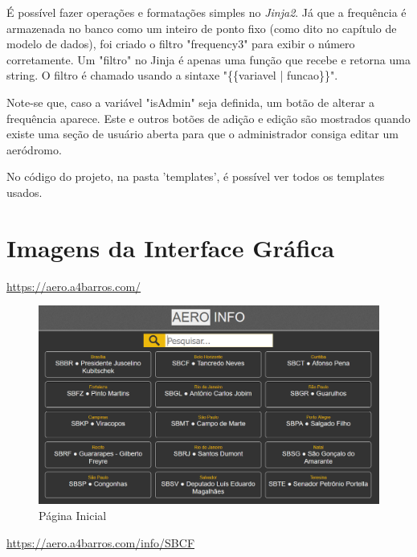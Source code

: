 É possível fazer operações e formatações simples no \textit{Jinja2}. Já que a frequência 
é armazenada no banco como um inteiro de ponto fixo (como dito no capítulo de modelo de dados), 
foi criado o filtro "frequency3" para exibir o número corretamente. Um "filtro" no Jinja 
é apenas uma função que recebe e retorna
uma string. O filtro é chamado usando a sintaxe "\{\{variavel | funcao\}\}".


Note-se que, caso a variável "isAdmin" seja definida, um botão de alterar a frequência aparece. Este
e outros botões de adição e edição são mostrados quando existe uma seção de usuário aberta para que o administrador
consiga editar um aeródromo.

No código do projeto, na pasta 'templates', é possível ver todos os templates usados.

\section{Imagens da Interface Gráfica}

\url{https://aero.a4barros.com/}

\begin{figure}[H]
    \begin{center}
    \includegraphics[width=\linewidth]{img/sel-aeroporto.png}
    \caption{Página Inicial}
    \label{fig:sel-aeroporto}
    \end{center}
\end{figure}

\url{https://aero.a4barros.com/info/SBCF}

